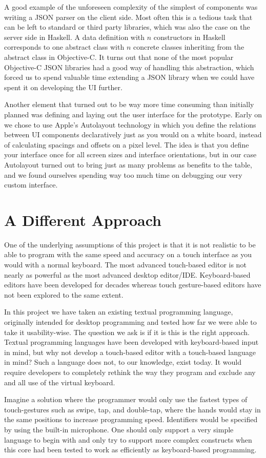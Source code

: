 A good example of the unforeseen complexity of the simplest of components was writing a JSON parser on the client side. Most often this is a tedious task that can be left to standard or third party libraries, which was also the case on the server side in Haskell. A data definition with $n$ constructors in Haskell corresponds to one abstract class with $n$ concrete classes inheriting from the abstract class in Objective-C. It turns out that none of the most popular Objective-C JSON libraries had a good way of handling this abstraction, which forced us to spend valuable time extending a JSON library when we could have spent it on developing the UI further.

Another element that turned out to be way more time consuming than initially planned was defining and laying out the user interface for the prototype. Early on we chose to use Apple's Autolayout technology in which you define the relations between UI components declaratively just as you would on a white board, instead of calculating spacings and offsets on a pixel level. The idea is that you define your interface once for all screen sizes and interface orientations, but in our case Autolayout turned out to bring just as many problems as benefits to the table, and we found ourselves spending way too much time on debugging our very custom interface.

\section{A Different Approach}
One of the underlying assumptions of this project is that it is not realistic to be able to program with the same speed and accuracy on a touch interface as you would with a normal keyboard. The most advanced touch-based editor is not nearly as powerful as the most advanced desktop editor/IDE. Keyboard-based editors have been developed for decades whereas touch gesture-based editors have not been explored to the same extent. 

In this project we have taken an existing textual programming language, originally intended for desktop programming and tested how far we were able to take it usability-wise. The question we ask is if it is this is the right approach. Textual programming languages have been developed with keyboard-based input in mind, but why not develop a touch-based editor with a touch-based language in mind? Such a language does not, to our knowledge, exist today. It would require developers to completely rethink the way they program and exclude any and all use of the virtual keyboard.

Imagine a solution where the programmer would only use the fastest types of touch-gestures such as swipe, tap, and double-tap, where the hands would stay in the same positions to increase programming speed. Identifiers would be specified by using the built-in microphone. One should only support a very simple language to begin with and only try to support more complex constructs when this core had been tested to work as efficiently as keyboard-based programming.

